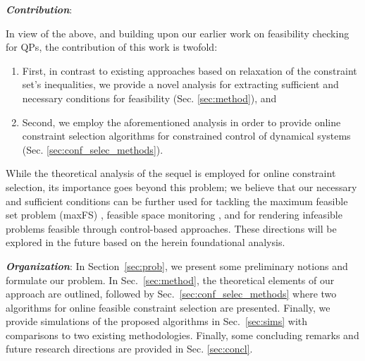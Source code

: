 \documentclass[letterpaper, 10 pt, conference]{ieeeconf}  %
\begin{document}
\textit{\textbf{Contribution}}:
{\color{blue}
In view of the above, and building upon our earlier work on feasibility checking for QPs, the contribution of this work is twofold: 
\begin{enumerate}
    \item First, in contrast to existing approaches based on relaxation of the constraint set's inequalities, we provide a novel analysis for extracting sufficient and necessary conditions for feasibility (Sec. \ref{sec:method}), and
    \item Second, we employ the aforementioned analysis in order to provide online constraint selection algorithms for constrained control of dynamical systems (Sec. \ref{sec:conf_selec_methods}). 
\end{enumerate}
While the theoretical analysis of the sequel is employed for online constraint selection, its importance goes beyond this problem; we believe that our necessary and sufficient conditions can be further used for tackling the maximum feasible set problem (maxFS) \cite{chinneck}, feasible space monitoring \cite{hardik2024}, and for rendering infeasible problems feasible through control-based approaches. These directions will be explored in the future based on the herein foundational analysis.     
}
\par 
{\color{red}
\textit{\textbf{Organization}}: In Section~\ref{sec:prob}, we present some preliminary notions and formulate our problem. In Sec.~\ref{sec:method}, the theoretical elements of our approach are outlined, followed by Sec.~\ref{sec:conf_selec_methods} where two algorithms for online feasible constraint selection are presented. Finally, we provide simulations of the proposed algorithms in Sec.~\ref{sec:sims} with comparisons to two existing methodologies. Finally, some concluding remarks and future research directions are provided in Sec. \ref{sec:concl}. 
}
\par 
\end{document}
